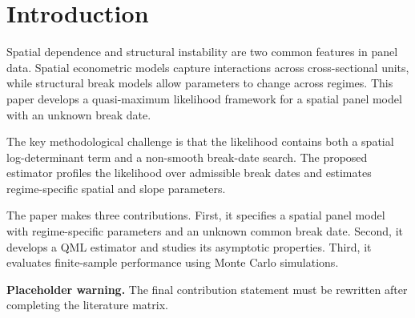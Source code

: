 \section{Introduction}\label{sec:introduction}

Spatial dependence and structural instability are two common features in panel data. Spatial econometric models capture interactions across cross-sectional units, while structural break models allow parameters to change across regimes. This paper develops a quasi-maximum likelihood framework for a spatial panel model with an unknown break date.

The key methodological challenge is that the likelihood contains both a spatial log-determinant term and a non-smooth break-date search. The proposed estimator profiles the likelihood over admissible break dates and estimates regime-specific spatial and slope parameters.

The paper makes three contributions. First, it specifies a spatial panel model with regime-specific parameters and an unknown common break date. Second, it develops a QML estimator and studies its asymptotic properties. Third, it evaluates finite-sample performance using Monte Carlo simulations.

\textbf{Placeholder warning.} The final contribution statement must be rewritten after completing the literature matrix.


